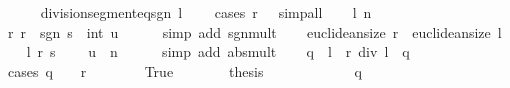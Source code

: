 \begin{isabellebody}
\ \ \ \ \isamarkupfalse%
\ division{\isacharunderscore}{\kern0pt}segment{\isacharunderscore}{\kern0pt}eq{\isacharunderscore}{\kern0pt}sgn\ {\isacartoucheopen}l\ {\isasymnoteq}\ {}{\isacartoucheclose}\ \isamarkupfalse%
\ {\isacharparenleft}{\kern0pt}cases\ {\isachardoublequoteopen}r\ {\isacharequal}{\kern0pt}\ {}{\isachardoublequoteclose}{\isacharparenright}{\kern0pt}\ simp{\isacharunderscore}{\kern0pt}all\isanewline
\ \ \isamarkupfalse%
\ l\ {\isacartoucheopen}n\ {\isachargreater}{\kern0pt}\ {}{\isacartoucheclose}\ \isamarkupfalse%
\ r{\isacharcolon}{\kern0pt}\ {\isachardoublequoteopen}r\ {\isacharequal}{\kern0pt}\ sgn\ s\ {\isacharasterisk}{\kern0pt}\ int\ u{\isachardoublequoteclose}\isanewline
\ \ \ \ \isamarkupfalse%
\ {\isacharparenleft}{\kern0pt}simp\ add{\isacharcolon}{\kern0pt}\ sgn{\isacharunderscore}{\kern0pt}mult{\isacharparenright}{\kern0pt}\isanewline
\ \ \isamarkupfalse%
\ {\isachardoublequoteopen}euclidean{\isacharunderscore}{\kern0pt}size\ r\ {\isacharless}{\kern0pt}\ euclidean{\isacharunderscore}{\kern0pt}size\ l{\isachardoublequoteclose}\isanewline
\ \ \isamarkupfalse%
\ l\ r\ {\isacartoucheopen}s\ {\isasymnoteq}\ {}{\isacartoucheclose}\ \isamarkupfalse%
\ {\isachardoublequoteopen}u\ {\isacharless}{\kern0pt}\ n{\isachardoublequoteclose}\isanewline
\ \ \ \ \isamarkupfalse%
\ {\isacharparenleft}{\kern0pt}simp\ add{\isacharcolon}{\kern0pt}\ abs{\isacharunderscore}{\kern0pt}mult{\isacharparenright}{\kern0pt}\isanewline
\ \ \isamarkupfalse%
\ {\isachardoublequoteopen}{\isacharparenleft}{\kern0pt}q\ {\isacharasterisk}{\kern0pt}\ l\ {\isacharplus}{\kern0pt}\ r{\isacharparenright}{\kern0pt}\ div\ l\ {\isacharequal}{\kern0pt}\ q{\isachardoublequoteclose}\isanewline
\ \ \isamarkupfalse%
\ {\isacharparenleft}{\kern0pt}cases\ {\isachardoublequoteopen}q\ {\isacharequal}{\kern0pt}\ {}\ {\isasymor}\ r\ {\isacharequal}{\kern0pt}\ {}{\isachardoublequoteclose}{\isacharparenright}{\kern0pt}\isanewline
\ \ \ \ \isamarkupfalse%
\ True\isanewline
\ \ \ \ \isamarkupfalse%
\ \isamarkupfalse%
\ {\isacharquery}{\kern0pt}thesis\isanewline
\ \ \ \ \isamarkupfalse%
\isanewline
\ \ \ \ \ \ \isamarkupfalse%
\ {\isachardoublequoteopen}q\ {\isacharequal}{\kern0pt}\ {}{\isachardoublequoteclose}\isanewline
\ \ \ \ \ \ \isamarkupfalse%

\end{isabellebody}
